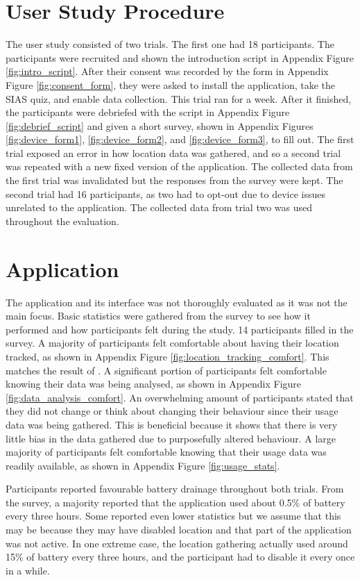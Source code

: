 \documentclass{l4proj}
\begin{document}
\section{User Study Procedure}
The user study consisted of two trials. The first one had 18 participants. The participants were recruited and shown the introduction script in Appendix Figure \ref{fig:intro_script}. After their consent was recorded by the form in Appendix Figure \ref{fig:consent_form}, they were asked to install the application, take the SIAS quiz, and enable data collection. This trial ran for a week. After it finished, the participants were debriefed with the script in Appendix Figure \ref{fig:debrief_script} and given a short survey, shown in Appendix Figures \ref{fig:device_form1}, \ref{fig:device_form2}, and \ref{fig:device_form3}, to fill out. The first trial exposed an error in how location data was gathered, and so a second trial was repeated with a new fixed version of the application. The collected data from the first trial was invalidated but the responses from the survey were kept. The second trial had 16 participants, as two had to opt-out due to device issues unrelated to the application. The collected data from trial two was used throughout the evaluation.

\section{Application}
The application and its interface was not thoroughly evaluated as it was not the main focus. Basic statistics were gathered from the survey to see how it performed and how participants felt during the study. 14 participants filled in the survey. A majority of participants felt comfortable about having their location tracked, as shown in Appendix Figure \ref{fig:location_tracking_comfort}. This matches the result of \cite{wood}. A significant portion of participants felt comfortable knowing their data was being analysed, as shown in Appendix Figure \ref{fig:data_analysis_comfort}. An overwhelming amount of participants stated that they did not change or think about changing their behaviour since their usage data was being gathered. This is beneficial because it shows that there is very little bias in the data gathered due to purposefully altered behaviour. A large majority of participants felt comfortable knowing that their usage data was readily available, as shown in Appendix Figure \ref{fig:usage_stats}. 

Participants reported favourable battery drainage throughout both trials. From the survey, a majority reported that the application used about 0.5\% of battery every three hours. Some reported even lower statistics but we assume that this may be because they may have disabled location and that part of the application was not active. In one extreme case, the location gathering actually used around 15\% of battery every three hours, and the participant had to disable it every once in a while. 
\end{document}
